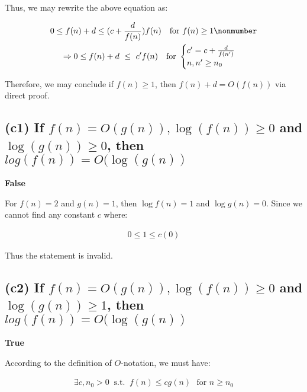 \documentclass[12pt]{article}
\begin{document}
Thus, we may rewrite the above equation as:


\begin{gather}
    0 \leq f(n)+d \leq (c + \frac{d}{f(n)})f(n) \ \ \ \text{for $f(n) \geq 1$} \nonmumber\\
    \Rightarrow 0 \leq f(n)+d \ \leq \ c'f(n) \ \ \ \text{for } \begin{cases}
                     c' = c + \frac{d}{f(n')} \\
                     n, n' \geq n_{0}
                    \end{cases}
\end{gather}

Therefore, we may conclude if $f(n) \geq 1$, then $f(n) + d = O(f(n))$ via direct proof.




\subsection{(c1) If $f(n) = O(g(n)), \log(f(n)) \geq 0$ and $\log(g(n)) \geq 0$, then $log(f(n)) = O(\log(g(n))$}

\textbf{False}

For $f(n) = 2$ and $g(n) = 1$, then $\log f(n) = 1$ and $\log g(n) = 0$. Since we cannot find any constant $c$ where:

\begin{gather}
    0 \leq 1 \leq c(0)
\end{gather}

Thus the statement is invalid.

\subsection{(c2) If $f(n) = O(g(n)), \log(f(n)) \geq 0$ and $\log(g(n)) \geq 1$, then $log(f(n)) = O(\log(g(n))$}
\textbf{True}


According to the definition of $O$-notation, we must have:

\begin{gather}
    \exists c, n_{0} > 0 \ \text{ s.t. } \ f(n) \leq cg(n) \ \ \ \text{for $n \geq n_{0}$}
\end{gather}
\end{document}
